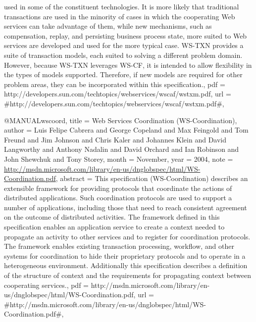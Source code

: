 {{used
	in some of the constituent technologies. It is more likely that
traditional
	transactions are used in the minority of cases in which
the cooperating
	Web services can take advantage of them, while new
mechanisms, such
	as compensation, replay, and persisting business process
state, more
	suited to Web services are developed and used for the more
typical
	case. WS-TXN provides a suite of transaction models, each
suited
	to solving a different problem domain. However, because WS-TXN
leverages
	WS-CF, it is intended to allow flexibility in the types of
models
	supported. Therefore, if new models are required for other
problem
	areas, they can be incorporated within this specification.},
  pdf = {http://developers.sun.com/techtopics/webservices/wscaf/wstxm.pdf},
  url = {#http://developers.sun.com/techtopics/webservices/wscaf/wstxm.pdf#},
}

@MANUAL{wscoord,
  title = {{Web Services Coordination (WS-Coordination)}},
  author = {Luis Felipe Cabrera and George Copeland and Max Feingold and Tom
	Freund and Jim Johnson and Chris Kaler and Johannes Klein and David
	Langworthy and Anthony Nadalin and David Orchard and Ian Robinson
	and John Shewchuk and Tony Storey},
  month = {November},
  year = {2004},
  note = {\url{http://msdn.microsoft.com/library/en-us/dnglobspec/html/WS-Coordination.pdf}},
  abstract = {This specification (WS-Coordination) describes an
extensible framework
	for providing protocols that coordinate the
actions of distributed
	applications. Such coordination protocols
are used to support a number
	of applications, including those that
need to reach consistent agreement
	on the outcome of distributed
activities. The framework defined in
	this specification enables an
application service to create a context
	needed to propagate an activity
to other services and to register
	for coordination protocols. The
framework enables existing transaction
	processing, workflow, and
other systems for coordination to hide
	their proprietary protocols
and to operate in a heterogeneous environment.
	Additionally this
specification describes a definition of the structure
	of context and the
requirements for propagating context between cooperating
	services.},
  pdf = {http://msdn.microsoft.com/library/en-us/dnglobspec/html/WS-Coordination.pdf},
  url = {#http://msdn.microsoft.com/library/en-us/dnglobspec/html/WS-Coordination.pdf#},
}

